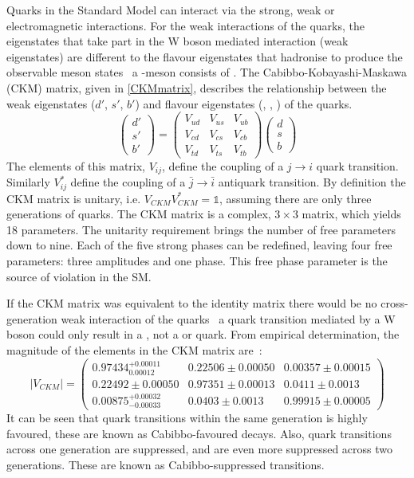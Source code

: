 Quarks in the Standard Model can interact via the strong, weak or electromagnetic interactions. For the weak interactions of the quarks, the eigenstates that take part in the W boson mediated interaction (weak eigenstates) are different to the flavour eigenstates that hadronise to produce the observable meson states \eg\ a \Bm-meson consists of \uquarkbar\bquark. The Cabibbo-Kobayashi-Maskawa (CKM) matrix, given in \eqn \ref{CKMmatrix}, describes the relationship between the weak eigenstates ($d'$, $s'$, $b'$) and flavour eigenstates (\dquark, \squark, \bquark) of the quarks. 
\begin{equation}
\left(
\begin{array}{c} d' \\ s' \\ b'  \end{array} \right) =
\begin{pmatrix} V_{ud} & V_{us} & V_{ub} \\ V_{cd} & V_{cs} & V_{cb} \\ V_{td} & V_{ts} & V_{tb} \end{pmatrix} \left( 
\begin{array}{c} d \\ s \\ b \end{array} \right)
\label{CKMmatrix}
\end{equation}
The elements of this matrix, $V_{ij}$, define the coupling of a $j \to i$ quark transition. Similarly $V_{ij}^*$ define the coupling of a $\bar{j} \to \bar{i}$ antiquark transition. By definition the CKM matrix is unitary, i.e. $V_{CKM}V_{CKM}^* = \mathds{1}$, assuming there are only three generations of quarks. The CKM matrix is a complex, $3 \times 3$ matrix, which yields 18 parameters. The unitarity requirement brings the number of free parameters down to nine. Each of the five strong phases can be redefined, leaving four free parameters: three amplitudes and one phase. This free phase parameter is the source of \CP violation in the SM.

If the CKM matrix was equivalent to the identity matrix there would be no cross-generation weak interaction of the quarks \eg\ a \uquark quark transition mediated by a W boson could only result in a \dquark, not a \squark or \bquark quark. From empirical determination, the magnitude of the elements in the CKM matrix are~\cite{PDG2016}:
\begin{equation}
| V_{CKM} | = \begin{pmatrix} 0.97434^{+0.00011}_{0.00012} & 0.22506 \pm 0.00050 & 0.00357 \pm 0.00015 \\ 0.22492 \pm 0.00050 & 0.97351 \pm 0.00013 & 0.0411 \pm 0.0013 \\ 0.00875^{+0.00032}_{-0.00033} & 0.0403 \pm 0.0013 & 0.99915 \pm 0.00005 \end{pmatrix}
\end{equation}
It can be seen that quark transitions within the same generation is highly favoured, these are known as Cabibbo-favoured decays. Also, quark transitions across one generation are suppressed, and are even more suppressed across two generations. These are known as Cabibbo-suppressed transitions.

